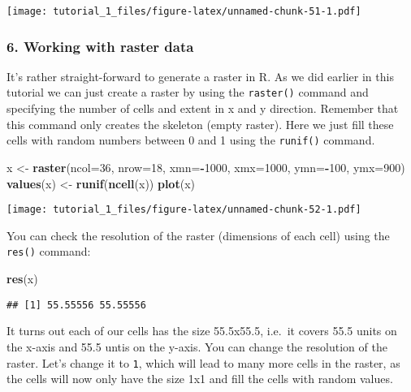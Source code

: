 \documentclass[]{article}
\newenvironment{Shaded}{\begin{snugshade}}{\end{snugshade}}
\newcommand{\DataTypeTok}[1]{\textcolor[rgb]{0.13,0.29,0.53}{#1}}
\newcommand{\DecValTok}[1]{\textcolor[rgb]{0.00,0.00,0.81}{#1}}
\newcommand{\KeywordTok}[1]{\textcolor[rgb]{0.13,0.29,0.53}{\textbf{#1}}}
\newcommand{\NormalTok}[1]{#1}
\newcommand{\OperatorTok}[1]{\textcolor[rgb]{0.81,0.36,0.00}{\textbf{#1}}}
\newcommand{\StringTok}[1]{\textcolor[rgb]{0.31,0.60,0.02}{#1}}
\begin{document}
\texttt{[image: tutorial\_1\_files/figure-latex/unnamed-chunk-51-1.pdf]}

\hypertarget{working-with-raster-data}{%
\subsubsection{6. Working with raster
data}\label{working-with-raster-data}}

It's rather straight-forward to generate a raster in R. As we did
earlier in this tutorial we can just create a raster by using the
\texttt{raster()} command and specifying the number of cells and extent
in x and y direction. Remember that this command only creates the
skeleton (empty raster). Here we just fill these cells with random
numbers between 0 and 1 using the \texttt{runif()} command.

\begin{Shaded}
\begin{Highlighting}[]
\NormalTok{x <-}\StringTok{ }\KeywordTok{raster}\NormalTok{(}\DataTypeTok{ncol=}\DecValTok{36}\NormalTok{, }\DataTypeTok{nrow=}\DecValTok{18}\NormalTok{, }\DataTypeTok{xmn=}\OperatorTok{-}\DecValTok{1000}\NormalTok{, }\DataTypeTok{xmx=}\DecValTok{1000}\NormalTok{, }\DataTypeTok{ymn=}\OperatorTok{-}\DecValTok{100}\NormalTok{, }\DataTypeTok{ymx=}\DecValTok{900}\NormalTok{)}
\KeywordTok{values}\NormalTok{(x) <-}\StringTok{ }\KeywordTok{runif}\NormalTok{(}\KeywordTok{ncell}\NormalTok{(x))}
\KeywordTok{plot}\NormalTok{(x)}
\end{Highlighting}
\end{Shaded}

\texttt{[image: tutorial\_1\_files/figure-latex/unnamed-chunk-52-1.pdf]}

You can check the resolution of the raster (dimensions of each cell)
using the \texttt{res()} command:

\begin{Shaded}
\begin{Highlighting}[]
\KeywordTok{res}\NormalTok{(x)}
\end{Highlighting}
\end{Shaded}

\begin{verbatim}
## [1] 55.55556 55.55556
\end{verbatim}

It turns out each of our cells has the size 55.5x55.5, i.e.~it covers
55.5 units on the x-axis and 55.5 untis on the y-axis. You can change
the resolution of the raster. Let's change it to \texttt{1}, which will
lead to many more cells in the raster, as the cells will now only have
the size 1x1 and fill the cells with random values.
\end{document}
